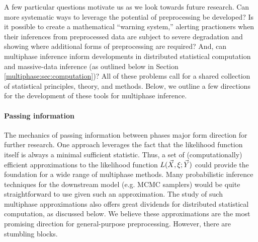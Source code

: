 A few particular questions motivate us as we look towards future research.
Can more systematic ways to leverage the potential of preprocessing be developed?
Is it possible to create a  mathematical ``warning system,'' alerting practioners when their inferences from preprocessed data are subject to severe degradation and showing where additional forms of preprocessing are required?
And, can multiphase inference inform developments in distributed statistical computation and massive-data inference (as outlined below in Section \ref{multiphase:sec:computation})?
All of these problems call for a shared collection of statistical principles, theory, and methods.
Below, we outline a few directions for the development of these tools for multiphase inference.


\paragraph{Passing information}
The mechanics of passing information between phases major form direction for further research.
One approach leverages the fact that the likelihood function itself is always a minimal sufficient statistic.
Thus, a set of (computationally) efficient approximations to the likelihood function $L(\vec X, \xi; \vec Y)$ could provide the foundation for a wide range of multiphase methods.
Many probabilistic inference techniques for the downstream model (e.g. MCMC samplers) would be quite straightforward to use given such an approximation.
The study of such multiphase approximations also offers great dividends for distributed statistical computation, as discussed below.
We believe these approximations are the most promising direction for general-purpose preprocessing.
However, there are stumbling blocks.

